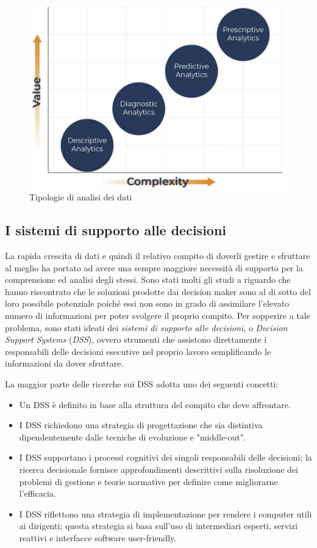 \begin{figure}[!h]
    \centering
    \includegraphics[width=0.75\linewidth]{figure/capitolo_2/Analytics Models.pdf}
    \caption{Tipologie di analisi dei dati}
    \label{fig:Analytics Models}
\end{figure}

\subsection{I sistemi di supporto alle decisioni}

La rapida crescita di dati e quindi il relativo compito di doverli gestire e sfruttare al meglio ha portato ad avere una sempre maggiore necessità di supporto per la comprensione ed analisi degli stessi. Sono stati molti gli studi a riguardo che hanno riscontrato che le soluzioni prodotte dai decision maker sono al di sotto del loro possibile potenziale poiché essi non sono in grado di assimilare l'elevato numero di informazioni per poter svolgere il proprio compito. Per sopperire a tale problema, sono stati ideati dei \textit{sistemi di supporto alle decisioni}, o \textit{Decision Support Systems} (\textit{DSS}), ovvero strumenti che assistono direttamente i responsabili delle decisioni esecutive nel proprio lavoro semplificando le informazioni da dover sfruttare.\cite{dss_introduction}

La maggior parte delle ricerche sui DSS adotta uno dei seguenti concetti:\cite{mit_keen_dss}

\begin{itemize}
    \item Un DSS è definito in base alla struttura del compito che deve affrontare.
    \item I DSS richiedono una strategia di progettazione che sia distintiva dipendentemente dalle tecniche di evoluzione e "middle-out".
    \item I DSS supportano i processi cognitivi dei singoli responsabili delle decisioni; la ricerca decisionale fornisce approfondimenti descrittivi sulla risoluzione dei problemi di gestione e teorie normative per definire come migliorarne l'efficacia.
    \item I DSS riflettono una strategia di implementazione per rendere i computer utili ai dirigenti; questa strategia si basa sull'uso di intermediari esperti, servizi reattivi e interfacce software user-friendly.
\end{itemize}

